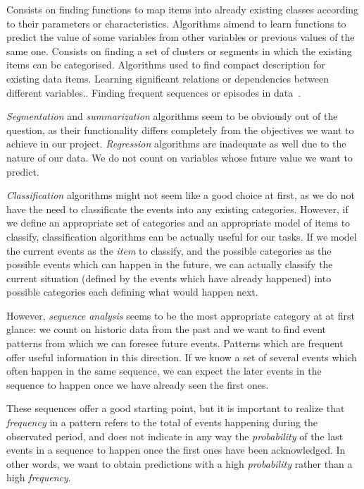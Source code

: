 \documentclass[a4paper,12pt]{article}
\begin{document}
\begin{enumerate}
  Consists on finding functions to map items into already existing classes according to their parameters or characteristics.
  Algorithms aimend to learn functions to predict the value of some variables from other variables or previous values of the same one.
  Consists on finding a set of clusters or segments in which the existing items can be categorised.
  Algorithms used to find compact description for existing data items.
  Learning significant relations or dependencies between different variables.\cite{Zhao2003association}.
  Finding frequent sequences or episodes in data~\cite{zhao2003sequential,weiss2002predicting}.
\end{enumerate}

\emph{Segmentation} and \emph{summarization} algorithms seem to be obviously out of the question, as their functionality differs completely from the objectives we want to achieve in our project. \emph{Regression} algorithms are inadequate as well due to the nature of our data. We do not count on variables whose future value we want to predict.

\emph{Classification} algorithms might not seem like a good choice at first, as we do not have the need to classificate the events into any existing categories. However, if we define an appropriate set of categories and an appropriate model of items to classify, classification algorithms can be actually useful for our tasks. If we model the current events as the \emph{item} to classify, and the possible categories as the possible events which can happen in the future, we can actually classify the current situation (defined by the events which have already happened) into possible categories each defining what would happen next.

However, \emph{sequence analysis} seems to be the most appropriate category at at first glance: we count on historic data from the past and we want to find event patterns from which we can foresee future events. Patterns which are frequent offer useful information in this direction. If we know a set of several events which often happen in the same sequence, we can expect the later events in the sequence to happen once we have already seen the first ones.

These sequences offer a good starting point, but it is important to realize that \emph{frequency} in a pattern refers to the total of events happening during the observated period, and does not indicate in any way the \emph{probability} of the last events in a sequence to happen once the first ones have been acknowledged. In other words, we want to obtain predictions with a high \emph{probability} rather than a high \emph{frequency}.
\end{document}
